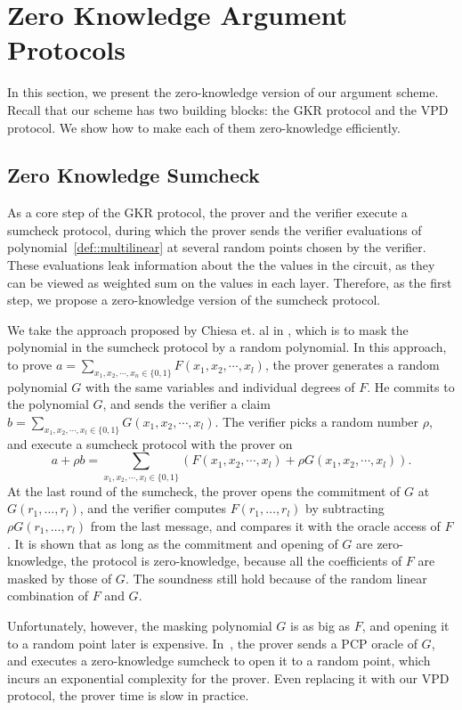 
\section{Zero Knowledge Argument Protocols}

In this section, we present the zero-knowledge version of our argument scheme. Recall that our scheme has two building blocks: the GKR protocol and the VPD protocol. We show how to make each of them zero-knowledge efficiently.

\subsection{Zero Knowledge Sumcheck}\label{ZKSumcheck}
As a core step of the GKR protocol, the prover and the verifier execute a sumcheck protocol, during which the prover sends the verifier evaluations of polynomial~\ref{def::multilinear} at several random points chosen by the verifier. These evaluations leak information about the the values in the circuit, as they can be viewed as weighted sum on the values in each layer. Therefore, as the first step, we propose a zero-knowledge version of the sumcheck protocol. 

We take the approach proposed by Chiesa et. al in \cite{zksumcheck}, which is to mask the polynomial in the sumcheck protocol by a random polynomial. In this approach, to prove $a = \sum\limits_{x_1, x_2, \cdots, x_n \in \{0, 1\}}F(x_1, x_2, \cdots, x_l)$, the prover generates a random polynomial $G$ with the same variables and individual degrees of $F$. He commits to the polynomial $G$, and sends the verifier a claim $b = \sum\limits_{x_1, x_2, \cdots, x_l \in \{0, 1\}}G(x_1, x_2, \cdots, x_l)$. The verifier picks a random number $\rho$, and execute a sumcheck protocol with the prover on $$a + \rho b = \sum\limits_{x_1, x_2, \cdots, x_l \in \{0, 1\}}(F(x_1, x_2, \cdots, x_l) + \rho G(x_1, x_2, \cdots, x_l)).$$ At the last round of the sumcheck, the prover opens the commitment of $G$ at $G(r_1, \ldots, r_l)$, and the verifier computes $F(r_1, \ldots, r_l)$ by subtracting $\rho G(r_1, \ldots, r_l)$ from the last message, and compares it with the oracle access of $F$. It is shown that as long as the commitment and opening of $G$ are zero-knowledge, the protocol is zero-knowledge, because all the coefficients of $F$ are masked by those of $G$. The soundness still hold because of the random linear combination of $F$ and $G$. 

Unfortunately, however, the masking polynomial $G$ is as big as $F$, and opening it to a random point later is expensive. In~\cite{zksumcheck}, the prover sends a PCP oracle of $G$, and executes a zero-knowledge sumcheck to open it to a random point, which incurs an exponential complexity for the prover. Even replacing it with our VPD protocol, the prover time is slow in practice.

